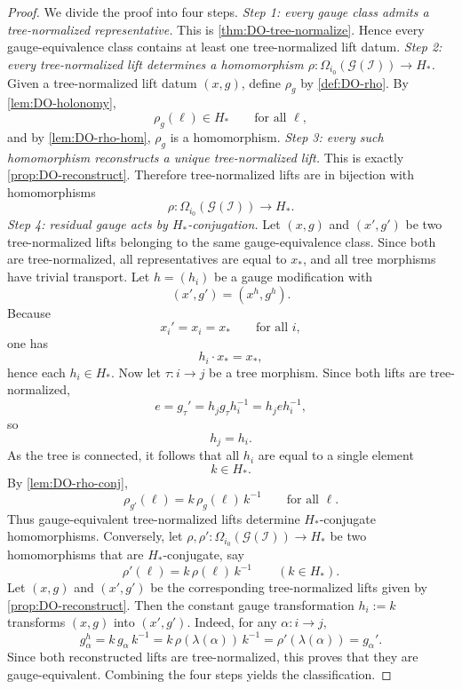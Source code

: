 \begin{proof}
	We divide the proof into four steps.
	\smallskip
	\noindent
	\emph{Step 1: every gauge class admits a tree-normalized
		representative.}
	This is \cref{thm:DO-tree-normalize}. Hence every gauge-equivalence
	class contains at least one tree-normalized lift datum.
	\smallskip
	\noindent
	\emph{Step 2: every tree-normalized lift determines a homomorphism
	\(\rho:\Omega_{i_0}(\mathcal G(\mathcal I))\to H_*\).}
	Given a tree-normalized lift datum \((x,g)\), define \(\rho_g\) by
	\cref{def:DO-rho}. By \cref{lem:DO-holonomy},
	\[
		\rho_g(\ell)\in H_*
		\qquad
		\text{for all }\ell,
	\]
	and by \cref{lem:DO-rho-hom}, \(\rho_g\) is a homomorphism.
	\smallskip
	\noindent
	\emph{Step 3: every such homomorphism reconstructs a unique
		tree-normalized lift.}
	This is exactly \cref{prop:DO-reconstruct}. Therefore tree-normalized
	lifts are in bijection with homomorphisms
	\[
		\rho:\Omega_{i_0}(\mathcal G(\mathcal I))\to H_*.
	\]
	\smallskip
	\noindent
	\emph{Step 4: residual gauge acts by \(H_*\)-conjugation.}
	Let \((x,g)\) and \((x',g')\) be two tree-normalized lifts belonging to
	the same gauge-equivalence class. Since both are tree-normalized, all
	representatives are equal to \(x_*\), and all tree morphisms have
	trivial transport.
	Let \(h=(h_i)\) be a gauge modification with
	\[
		(x',g')=(x^h,g^h).
	\]
	Because
	\[
		x_i'=x_i=x_*
		\qquad
		\text{for all }i,
	\]
	one has
	\[
		h_i\cdot x_*=x_*,
	\]
	hence each \(h_i\in H_*\).
	Now let \(\tau:i\to j\) be a tree morphism. Since both lifts are
	tree-normalized,
	\[
		e=g_\tau'=h_j g_\tau h_i^{-1}=h_j e h_i^{-1},
	\]
	so
	\[
		h_j=h_i.
	\]
	As the tree is connected, it follows that all \(h_i\) are equal to a
	single element
	\[
		k\in H_*.
	\]
	By \cref{lem:DO-rho-conj},
	\[
		\rho_{g'}(\ell)=k\,\rho_g(\ell)\,k^{-1}
		\qquad
		\text{for all }\ell.
	\]
	Thus gauge-equivalent tree-normalized lifts determine \(H_*\)-conjugate
	homomorphisms.
	Conversely, let \(\rho,\rho':\Omega_{i_0}(\mathcal G(\mathcal I))\to H_*\)
	be two homomorphisms that are \(H_*\)-conjugate, say
	\[
		\rho'(\ell)=k\,\rho(\ell)\,k^{-1}
		\qquad
		(k\in H_*).
	\]
	Let \((x,g)\) and \((x',g')\) be the corresponding tree-normalized lifts
	given by \cref{prop:DO-reconstruct}. Then the constant gauge
	transformation \(h_i:=k\) transforms \((x,g)\) into \((x',g')\). Indeed,
	for any \(\alpha:i\to j\),
	\[
		g_\alpha^h
		=
		k\,g_\alpha\,k^{-1}
		=
		k\,\rho(\lambda(\alpha))\,k^{-1}
		=
		\rho'(\lambda(\alpha))
		=
		g_\alpha'.
	\]
	Since both reconstructed lifts are tree-normalized, this proves that
	they are gauge-equivalent.
	Combining the four steps yields the classification.
\end{proof}
